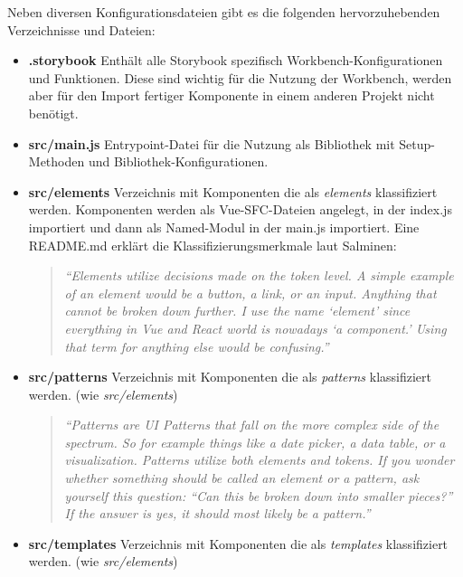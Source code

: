 Neben diversen Konfigurationsdateien gibt es die folgenden hervorzuhebenden Verzeichnisse und Dateien:
\begin{itemize}
    \item \textbf{.storybook}\newline
    Enthält alle Storybook spezifisch Workbench-Konfigurationen und Funktionen. Diese sind wichtig für die Nutzung der Workbench, werden aber für den Import fertiger Komponente in einem anderen Projekt nicht benötigt.
    \item \textbf{src/main.js}\newline
    Entrypoint-Datei für die Nutzung als Bibliothek mit Setup-Methoden und Bibliothek-Konfigurationen.
    \item \textbf{src/elements}\newline
    Verzeichnis mit Komponenten die als \textit{elements} klassifiziert werden. Komponenten werden als Vue-SFC-Dateien angelegt, in der index.js importiert und dann als Named-Modul in der main.js importiert. Eine README.md erklärt die Klassifizierungsmerkmale laut Salminen:
    \begin{quotation}
        \emph{``Elements utilize decisions made on the token level. A simple example of an element would be a button, a link, or an input. Anything that cannot be broken down further. I use the name ‘element’ since everything in Vue and React world is nowadays ‘a component.’ Using that term for anything else would be confusing.''} \citep{VUEDSElements}
    \end{quotation}
    \item \textbf{src/patterns}\newline
    Verzeichnis mit Komponenten die als \textit{patterns} klassifiziert werden. (wie \textit{src/elements})
    \begin{quotation}
        \emph{``Patterns are UI Patterns that fall on the more complex side of the spectrum. So for example things like a date picker, a data table, or a visualization. Patterns utilize both elements and tokens. 
        If you wonder whether something should be called an element or a pattern, ask yourself this question: “Can this be broken down into smaller pieces?” If the answer is yes, it should most likely be a pattern.''} \citep{VUEDSPatterns}
    \end{quotation}
    \item \textbf{src/templates}\newline
    Verzeichnis mit Komponenten die als \textit{templates} klassifiziert werden. (wie \textit{src/elements})

\end{itemize}
